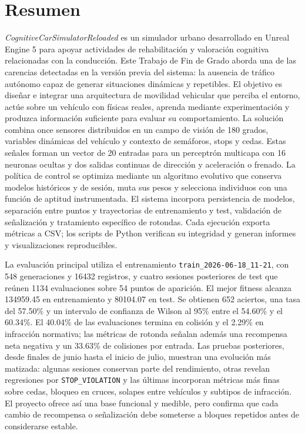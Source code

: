 \endgroup

\cleardoublepage
\chapter*{Resumen}

\textit{CognitiveCarSimulatorReloaded} es un simulador urbano desarrollado en Unreal Engine 5 para apoyar actividades de rehabilitación y valoración cognitiva relacionadas con la conducción. Este Trabajo de Fin de Grado aborda una de las carencias detectadas en la versión previa del sistema: la ausencia de tráfico autónomo capaz de generar situaciones dinámicas y repetibles. El objetivo es diseñar e integrar una arquitectura de movilidad vehicular que perciba el entorno, actúe sobre un vehículo con físicas reales, aprenda mediante experimentación y produzca información suficiente para evaluar su comportamiento. La solución combina once sensores distribuidos en un campo de visión de 180 grados, variables dinámicas del vehículo y contexto de semáforos, stops y cedas. Estas señales forman un vector de 20 entradas para un perceptrón multicapa con 16 neuronas ocultas y dos salidas continuas de dirección y aceleración o frenado. La política de control se optimiza mediante un algoritmo evolutivo que conserva modelos históricos y de sesión, muta sus pesos y selecciona individuos con una función de aptitud instrumentada. El sistema incorpora persistencia de modelos, separación entre puntos y trayectorias de entrenamiento y test, validación de señalización y tratamiento específico de rotondas. Cada ejecución exporta métricas a CSV; los scripts de Python verifican su integridad y generan informes y visualizaciones reproducibles.

La evaluación principal utiliza el entrenamiento \texttt{train\_2026-06-18\_11-21}, con 548 generaciones y 16432 registros, y cuatro sesiones posteriores de test que reúnen 1134 evaluaciones sobre 54 puntos de aparición. El mejor fitness alcanza 134959.45 en entrenamiento y 80104.07 en test. Se obtienen 652 aciertos, una tasa del 57.50\% y un intervalo de confianza de Wilson al 95\% entre el 54.60\% y el 60.34\%. El 40.04\% de las evaluaciones termina en colisión y el 2.29\% en infracción normativa; las métricas de rotonda señalan además una recompensa neta negativa y un 33.63\% de colisiones por entrada. Las pruebas posteriores, desde finales de junio hasta el inicio de julio, muestran una evolución más matizada: algunas sesiones conservan parte del rendimiento, otras revelan regresiones por \texttt{STOP\_VIOLATION} y las últimas incorporan métricas más finas sobre cedas, bloqueo en cruces, solapes entre vehículos y subtipos de infracción. El proyecto ofrece así una base funcional y medible, pero confirma que cada cambio de recompensa o señalización debe someterse a bloques repetidos antes de considerarse estable.

